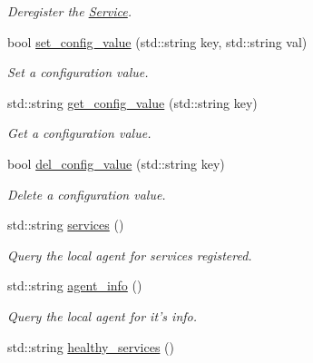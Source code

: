 \begin{DoxyCompactItemize}
\begin{DoxyCompactList}\small\item\em Deregister the \hyperlink{classService}{Service}. \end{DoxyCompactList}\item 
bool \hyperlink{classConsulAdmin_a152fc37965039733bb53c56e208b4492}{set\-\_\-config\-\_\-value} (std\-::string key, std\-::string val)
\begin{DoxyCompactList}\small\item\em Set a configuration value. \end{DoxyCompactList}\item 
\hypertarget{classConsulAdmin_a42569b08fba671535856c345fa05ef33}{std\-::string \hyperlink{classConsulAdmin_a42569b08fba671535856c345fa05ef33}{get\-\_\-config\-\_\-value} (std\-::string key)}\label{classConsulAdmin_a42569b08fba671535856c345fa05ef33}

\begin{DoxyCompactList}\small\item\em Get a configuration value. \end{DoxyCompactList}\item 
\hypertarget{classConsulAdmin_a177d6d946f41c4efa8ad0746e04b3641}{bool \hyperlink{classConsulAdmin_a177d6d946f41c4efa8ad0746e04b3641}{del\-\_\-config\-\_\-value} (std\-::string key)}\label{classConsulAdmin_a177d6d946f41c4efa8ad0746e04b3641}

\begin{DoxyCompactList}\small\item\em Delete a configuration value. \end{DoxyCompactList}\item 
\hypertarget{classConsulAdmin_a0e06b8914ba53221ad7756b1afe16d00}{std\-::string \hyperlink{classConsulAdmin_a0e06b8914ba53221ad7756b1afe16d00}{services} ()}\label{classConsulAdmin_a0e06b8914ba53221ad7756b1afe16d00}

\begin{DoxyCompactList}\small\item\em Query the local agent for services registered. \end{DoxyCompactList}\item 
\hypertarget{classConsulAdmin_a815abcc0f65f0f20d27e4832d1c08994}{std\-::string \hyperlink{classConsulAdmin_a815abcc0f65f0f20d27e4832d1c08994}{agent\-\_\-info} ()}\label{classConsulAdmin_a815abcc0f65f0f20d27e4832d1c08994}

\begin{DoxyCompactList}\small\item\em Query the local agent for it's info. \end{DoxyCompactList}\item 
\hypertarget{classConsulAdmin_a65391086283846fb4056a8f84105f9bd}{std\-::string \hyperlink{classConsulAdmin_a65391086283846fb4056a8f84105f9bd}{healthy\-\_\-services} ()}\label{classConsulAdmin_a65391086283846fb4056a8f84105f9bd}


\end{DoxyCompactItemize}
